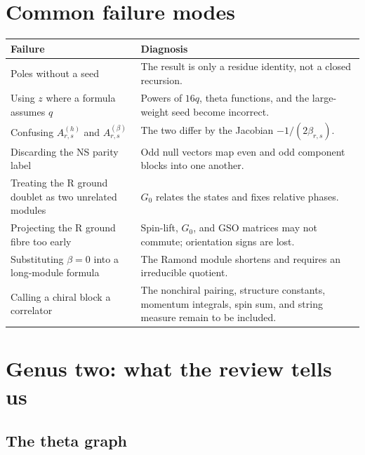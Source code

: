 \documentclass[11pt]{article}
\begin{document}
\section{Common failure modes}
\label{sec:failure-modes}

\begin{center}
\begin{tabularx}{\textwidth}{@{}L{0.27\textwidth}X@{}}
\toprule
Failure & Diagnosis\\
\midrule
Poles without a seed &
The result is only a residue identity, not a closed recursion.\\

Using \(z\) where a formula assumes \(q\) &
Powers of \(16q\), theta functions, and the large-weight seed become
incorrect.\\

Confusing \(A^{(h)}_{r,s}\) and \(A^{(\beta)}_{r,s}\) &
The two differ by the Jacobian
\(-1/(2\beta_{r,s})\).\\

Discarding the NS parity label &
Odd null vectors map even and odd component blocks into one another.\\

Treating the R ground doublet as two unrelated modules &
\(G_0\) relates the states and fixes relative phases.\\

Projecting the R ground fibre too early &
Spin-lift, \(G_0\), and GSO matrices may not commute; orientation signs are
lost.\\

Substituting \(\beta=0\) into a long-module formula &
The Ramond module shortens and requires an irreducible quotient.\\

Calling a chiral block a correlator &
The nonchiral pairing, structure constants, momentum integrals, spin sum,
and string measure remain to be included.\\
\bottomrule
\end{tabularx}
\end{center}

\section{Genus two: what the review tells us}
\label{sec:genus-two}

\subsection{The theta graph}
\end{document}
